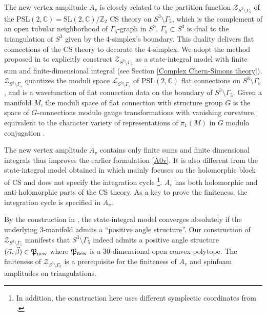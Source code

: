 \documentclass[aps,prd,notitlepage,nofootinbib,superscriptaddress,groupedaddress,twocolumn]{revtex4-1}
\newcommand{\Slc}{\mathrm{SL}(2,\mathbb{C})}
\newcommand{\PSlc}{\mathrm{PSL}(2,\mathbb{C})}
\newcommand{\cl}{\mathcal L}
\newcommand{\cz}{\mathcal Z}
\renewcommand{\a}{\alpha}
\renewcommand{\b}{\beta}
\newcommand{\G}{\Gamma}
\begin{document}
The new vertex amplitude $A_v$ is closely related to the partition function $\cz_{S^3\setminus\G_5}$ of the $\PSlc=\Slc/\mathbb{Z}_2$ CS theory on $S^3\setminus\G_5$, which is the complement of an open tubular neighborhood of $\G_5$-graph in $S^3$. $\G_5\subset S^3$ is dual to the triangulation of $S^3$ given by the 4-simplex's boundary. This duality delivers flat connections of the CS theory to decorate the 4-simplex. We adopt the method proposed in \cite{levelk} to explicitly construct $\cz_{S^3\setminus\G_5}$ as a state-integral model with finite sum and finite-dimensional integral (see Section \ref{Complex Chern-Simons theory}). $\cz_{S^3\setminus\G_5}$ quantizes the moduli space $\cl_{S^3\setminus\G_5}$ of $\PSlc$ flat connections on $S^3\setminus\G_5$, and is a wavefunction of flat connection data on the boundary of $S^3\setminus\G_5$. Given a manifold $M$, the moduli space of flat connection with structure group $G$ is the space of $G$-connections modulo gauge transformations with vanishing curvature, equivalent to the character variety of representations of $\pi_1(M)$ in $G$ modulo conjugation \cite{10.2307/2006973}.

The new vertex amplitude $A_v$ contains only finite sums and finite dimensional integrals thus improves the earlier formulation \eqref{A0v}. It is also different from the state-integral model obtained in \cite{hanSUSY} which mainly focuses on the holomorphic block of CS and does not specify the integration cycle \footnote{In addition, the construction here uses different symplectic coordinates from \cite{hanSUSY}.}. $A_v$ has both holomorphic and anti-holomorphic parts of the CS theory. As a key to prove the finiteness, the integration cycle is specified in $A_v$. 

By the construction in \cite{levelk}, the state-integral model converges absolutely if the underlying 3-manifold admits a ``positive angle structure''. Our construction of $\cz_{S^3\setminus\G_5}$ manifests that $S^3\setminus\G_5$ indeed admits a positive angle structure $(\vec{\a},\vec{\b})\in\Fp_{\rm new}$ where $\mathfrak{P}_{\rm new}$ is a 30-dimensional open convex polytope. The finiteness of $\cz_{S^3\setminus\G_5}$ is a prerequisite for the finiteness of $A_v$ and spinfoam amplitudes on triangulations.
\end{document}
